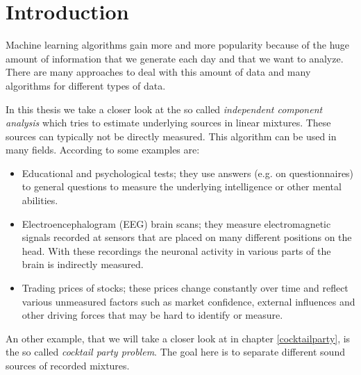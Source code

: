 \documentclass[12pt, a4paper]{article}
\numberwithin{equation}{section}
\numberwithin{figure}{section}
\numberwithin{table}{section}
\begin{document}
	\newpage
	
	
	
	\thispagestyle{plain}
	\tableofcontents
	\newpage
	
	\section{Introduction} %
	Machine learning algorithms gain more and more popularity because of the huge amount of information that we generate each day and that we want to analyze. %
	There are many approaches to deal with this amount of data and many algorithms for different types of data.
	
	In this thesis we take a closer look at the so called \textit{independent component analysis} which tries to estimate underlying sources in linear mixtures.
	These sources can typically not be directly measured.
	This algorithm can be used in many fields.
	According to \citet{elementsofstatisticallearning} some examples are: %
	\begin{itemize}
		\item Educational and psychological tests; they use answers (e.g. on questionnaires) to general questions to measure the underlying intelligence or other mental abilities.
		\item Electroencephalogram (EEG) brain scans; they measure electromagnetic signals recorded at sensors that are placed on many different positions on the head.
		With these recordings the neuronal activity in various parts of the brain is indirectly measured.
		\item Trading prices of stocks; these prices change constantly over time and reflect various unmeasured factors such as market confidence, external influences and other driving forces that may be hard to identify or measure.
	\end{itemize}
	An other example, that we will take a closer look at in chapter \ref{cocktailparty}, is the so called \textit{cocktail party problem}.
	The goal here is to separate different sound sources of recorded mixtures.
	
\end{document}
